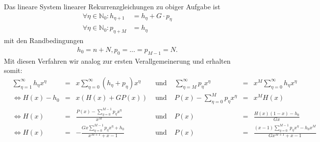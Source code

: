 \documentclass{article}
\theoremstyle{plain} %
\theoremstyle{definition} %
\begin{document}
Das lineare System linearer Rekurrenzgleichungen zu obiger Aufgabe ist
\begin{align}
  \forall \eta \in \mathbb{N}_0 : h_{\eta+1}   & = h_\eta + G \cdot p_\eta \\
  \forall \eta \in \mathbb{N}_0 : p_{\eta + M} & = h_\eta
\end{align}
mit den Randbedingungen \begin{align}
  h_0 = n + N, p_0 = ... = p_{M - 1} = N.
\end{align}
Mit diesen Verfahren wir analog zur ersten Verallgemeinerung und erhalten somit:
\begin{align}
   & \sum_{\eta=1}^\infty h_{\eta} x^{\eta} & = & x \sum_{\eta=0}^\infty (h_{\eta} + p_{\eta}) x^{\eta}             & \text{ und } & \sum_{\eta=M}^\infty p_{\eta} x^{\eta} & = & x^M \sum_{\eta=0}^\infty h_{\eta} x^{\eta}                            \\
   & \iff H(x) - h_0                        & = & x (H(x) + GP(x))                                                  & \text{ und } & P(x) - \sum_{\eta=0}^M p_\eta x^\eta   & = & x^M H(x)                                                              \\
   & \iff H(x)                              & = & \frac{P(x) - \sum_{\eta=0}^{M-1} p_\eta x^\eta}{x^M}              & \text{ und } & P(x)                                   & = & \frac{H(x)(1-x) - h_0}{Gx}                                            \\
   & \iff H(x)                              & = & -\frac{Gx\sum_{\eta=0}^{M-1}p_\eta x^\eta + h_0}{x^{M+1} + x - 1} & \text{ und } & P(x)                                   & = & \frac{(x-1)\sum_{\eta=0}^{M-1} p_\eta x^\eta - h_0 x^M}{Gx^{M+1}+x-1}
\end{align}
\end{document}
